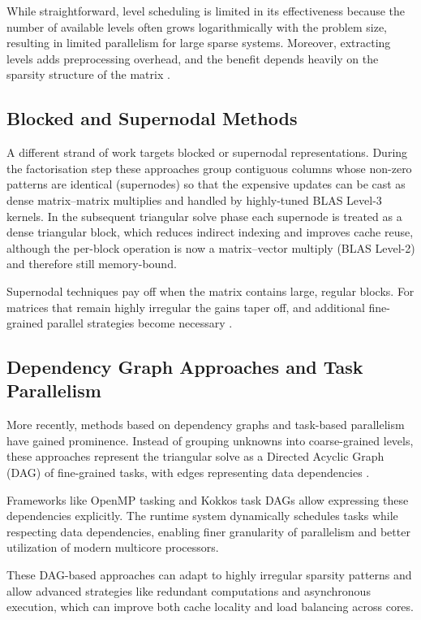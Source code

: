 While straightforward, level scheduling is limited in its effectiveness because the number of available levels often grows logarithmically with the problem size, resulting in limited parallelism for large sparse systems. Moreover, extracting levels adds preprocessing overhead, and the benefit depends heavily on the sparsity structure of the matrix \cite{10.1007/978-3-031-64850-2_42}.

\subsection{Blocked and Supernodal Methods}
A different strand of work targets blocked or supernodal representations. During the factorisation step these approaches
group contiguous columns whose non-zero patterns are identical (supernodes) so that the expensive updates can be cast as dense
matrix–matrix multiplies and handled by highly-tuned BLAS Level-3
kernels. In the subsequent triangular solve phase each supernode
is treated as a dense triangular block, which reduces indirect indexing
and improves cache reuse, although the per-block operation is now a
matrix–vector multiply (BLAS Level-2) and therefore still memory-bound.

Supernodal techniques pay off when the matrix contains large, regular
blocks. For matrices that remain highly irregular the gains taper off, and additional fine-grained
parallel strategies become necessary \cite{10.1145/3404397.3404428}.

\subsection{Dependency Graph Approaches and Task Parallelism}
More recently, methods based on dependency graphs and task-based parallelism have gained prominence. Instead of grouping unknowns into coarse-grained levels, these approaches represent the triangular solve as a Directed Acyclic Graph (DAG) of fine-grained tasks, with edges representing data dependencies  \cite{10.1007/978-3-031-64850-2_42}.

Frameworks like OpenMP tasking and Kokkos task DAGs allow expressing these dependencies explicitly. The runtime system dynamically schedules tasks while respecting data dependencies, enabling finer granularity of parallelism and better utilization of modern multicore processors.

These DAG-based approaches can adapt to highly irregular sparsity patterns and allow advanced strategies like redundant computations and asynchronous execution, which can improve both cache locality and load balancing across cores.

